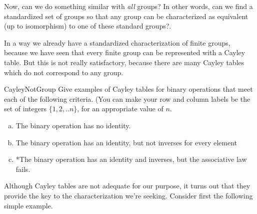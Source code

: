 Now, can we do something similar with \emph{all} 
groups? In other words, can we find  a standardized set of groups so that any group can be characterized as equivalent (up to isomorphism)  to one of these standard groups?. 

In a way we already have a standardized characterization of finite groups, because we have seen that every finite group can be represented with a Cayley table.  But this is not really satisfactory, because there are many Cayley tables which do not correspond to any group.

\begin{exercise}{CayleyNotGroup}
Give examples of Cayley tables for binary operations that meet each of the following criteria.  (You can make your row and column labels be the set of integers $\{1,2,..n\}$, for an appropriate value of $n$.
\begin{enumerate}[(a)]
\item
The binary operation has no identity.
\item
The binary operation has an identity, but not inverses for every element
\item
*The binary operation has an identity and inverses, but  the associative law fails.
\end{enumerate}
\end{exercise} 

Although Cayley tables are not adequate for our purpose, it turns out that they provide the key to the characterization we're seeking. Consider first the following simple example.

